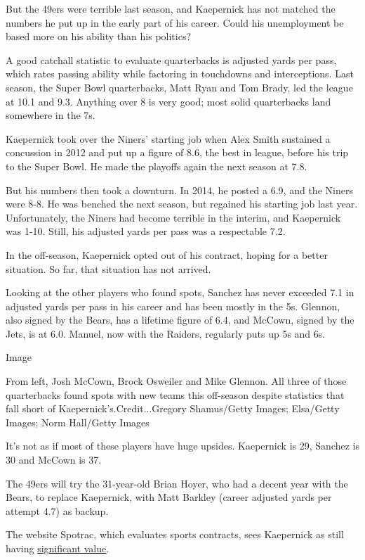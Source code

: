 But the 49ers were terrible last season, and Kaepernick has not matched
the numbers he put up in the early part of his career. Could his
unemployment be based more on his ability than his politics?

A good catchall statistic to evaluate quarterbacks is adjusted yards per
pass, which rates passing ability while factoring in touchdowns and
interceptions. Last season, the Super Bowl quarterbacks, Matt Ryan and
Tom Brady, led the league at 10.1 and 9.3. Anything over 8 is very good;
most solid quarterbacks land somewhere in the 7s.

Kaepernick took over the Niners' starting job when Alex Smith sustained
a concussion in 2012 and put up a figure of 8.6, the best in league,
before his trip to the Super Bowl. He made the playoffs again the next
season at 7.8.

But his numbers then took a downturn. In 2014, he posted a 6.9, and the
Niners were 8-8. He was benched the next season, but regained his
starting job last year. Unfortunately, the Niners had become terrible in
the interim, and Kaepernick was 1-10. Still, his adjusted yards per pass
was a respectable 7.2.

In the off-season, Kaepernick opted out of his contract, hoping for a
better situation. So far, that situation has not arrived.

Looking at the other players who found spots, Sanchez has never exceeded
7.1 in adjusted yards per pass in his career and has been mostly in the
5s. Glennon, also signed by the Bears, has a lifetime figure of 6.4, and
McCown, signed by the Jets, is at 6.0. Manuel, now with the Raiders,
regularly puts up 5s and 6s.

Image

From left, Josh McCown, Brock Osweiler and Mike Glennon. All three of
those quarterbacks found spots with new teams this off-season despite
statistics that fall short of Kaepernick's.Credit...Gregory Shamus/Getty
Images; Elsa/Getty Images; Norm Hall/Getty Images

It's not as if most of these players have huge upsides. Kaepernick is
29, Sanchez is 30 and McCown is 37.

The 49ers will try the 31-year-old Brian Hoyer, who had a decent year
with the Bears, to replace Kaepernick, with Matt Barkley (career
adjusted yards per attempt 4.7) as backup.

The website Spotrac, which evaluates sports contracts, sees Kaepernick
as still having
\href{http://www.spotrac.com/nfl/san-francisco-49ers/colin-kaepernick-7751/market-value/}{significant
value}.

